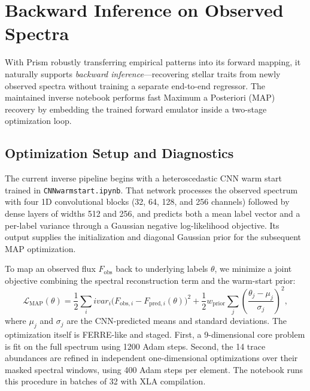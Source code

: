 \documentclass[preprint]{aastex701-1/aastex701}
\begin{document}
\section{Backward Inference on Observed Spectra}
\label{sec:backward_inference}

With Prism robustly transferring empirical patterns into its forward mapping, it naturally
supports \emph{backward inference}---recovering stellar traits from newly observed spectra
without training a separate end-to-end regressor. The maintained inverse notebook performs
fast Maximum a Posteriori (MAP) recovery by embedding the trained forward emulator inside a
two-stage optimization loop.

\subsection{Optimization Setup and Diagnostics}
\label{subsec:map_setup}
The current inverse pipeline begins with a heteroscedastic CNN warm start trained in
\texttt{CNNwarmstart.ipynb}. That network processes the observed spectrum with four 1D
convolutional blocks (32, 64, 128, and 256 channels) followed by dense layers of widths
512 and 256, and predicts both a mean label vector and a per-label variance through a
Gaussian negative log-likelihood objective. Its output supplies the initialization and
diagonal Gaussian prior for the subsequent MAP optimization.

To map an observed flux $F_\mathrm{obs}$ back to underlying labels $\theta$, we minimize a
joint objective combining the spectral reconstruction term and the warm-start prior:
\begin{equation}
\mathcal{L}_\mathrm{MAP}(\theta) = \frac{1}{2}\sum_i \mathit{ivar}_i \bigl(F_{\mathrm{obs},i} - F_{\mathrm{pred},i}(\theta)\bigr)^2 + \frac{1}{2} w_\mathrm{prior} \sum_j \left(\frac{\theta_j - \mu_j}{\sigma_j}\right)^2,
\end{equation}
where $\mu_j$ and $\sigma_j$ are the CNN-predicted means and standard deviations. The
optimization itself is FERRE-like and staged. First, a 9-dimensional core problem is fit
on the full spectrum using 1200 Adam steps. Second, the 14 trace abundances are refined in
independent one-dimensional optimizations over their masked spectral windows, using 400 Adam
steps per element. The notebook runs this procedure in batches of 32 with XLA compilation.
\end{document}
